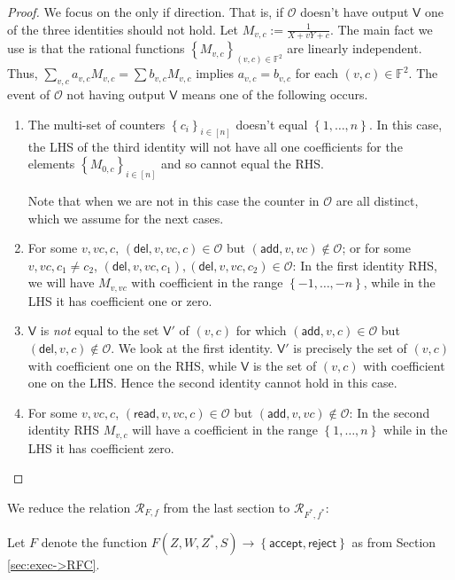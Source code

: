 \documentclass[11pt]{article} %
\newcommand{\F}{\ensuremath{\mathbb F}\xspace}
\newcommand{\rej}{\ensuremath{\mathsf{reject}}\xspace}
\newcommand{\acc}{\ensuremath{\mathsf{accept}}\xspace}
\newcommand{\defeq}{:=}
\newcommand{\sett}[2]{\ensuremath{\set{#1}_{#2}}\xspace}
\newcommand{\rel}{\ensuremath{\mathcal{R}}\xspace}
\newcommand{\set}[1]{\ensuremath{\left\{#1\right\}}\xspace}
\newcommand{\add}{\ensuremath{\mathsf{add}}\xspace}
\newcommand{\del}{\ensuremath{\mathsf{del}}\xspace}
\renewcommand{\read}{\ensuremath{\mathsf{read}}\xspace}
\newcommand{\ops}{\ensuremath{\mathcal{O}}\xspace}
\newcommand{\recset}{\ensuremath{\mathsf{V}}\xspace}
\begin{document}
\begin{proof}

We focus on the only if direction. That is, if \ops doesn't have output \recset one of the three identities should not hold.
 Let $M_{v,c}\defeq \frac{1}{X+vY+c}$. The main fact we use is that the rational functions $\sett{M_{v,c}}{(v,c)\in \F^2}$ are linearly independent.
 Thus, $\sum_{v,c} a_{v,c} M_{v,c} = \sum b_{v,c} M_{v,c}$ implies $a_{v,c}=b_{v,c}$ for each $(v,c)\in \F^2$.
 The event of \ops not having output \recset means one of the following occurs.
 \begin{enumerate}
  \item  The multi-set of counters $\sett{c_i}{i\in [n]}$ doesn't equal \set{1,\ldots,n}. In this case, the LHS of the third identity will not have all one coefficients for the elements \sett{M_{0,c}}{i\in [n]} and so cannot equal the RHS.
  
  Note that when we are not in this case the counter in \ops are all distinct, which we assume for the next cases.
 \item For some $v,vc,c$, $(\del,v,vc,c)\in \ops$ but $(\add,v,vc)\notin \ops$; or for some $v,vc,c_1\neq c_2$, $(\del,v,vc,c_1),(\del,v,vc,c_2)\in \ops$: In the first identity RHS, we will have $M_{v,vc}$ with coefficient in the range  $\set{-1,\ldots,-n}$, while in the LHS it has coefficient one or zero.
 \item \recset is \emph{not} equal to the set $\recset'$ of $(v,c)$ for which $(\add,v,c)\in \ops$ but $(\del,v,c)\notin \ops$. We look at the first identity. $\recset'$ is precisely the set of $(v,c)$ with coefficient one on the RHS, while \recset is the set of $(v,c)$ with coefficient one on the LHS. Hence the second identity cannot hold in this case.
\item For some $v,vc,c$, $(\read,v,vc,c)\in \ops$ but $(\add,v,vc)\notin \ops$: In the second identity RHS $M_{v,c}$ will have a coefficient in the range $\set{1,\ldots,n}$ while in the LHS it has coefficient zero.
 \end{enumerate}
\end{proof}







We reduce the relation $\rel_{F,f}$ from the last section to 
$\rel_{F^*,f^*}$:


Let $F$ denote the function $F(Z,W,Z^*,S)\to \set{\acc,\rej}$ as from Section \ref{sec:exec->RFC}.
\end{document}
